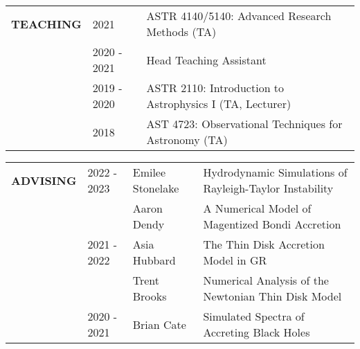 \documentclass{article}
\begin{document}
\begin{tabular}{p{4cm}p{2.2cm}l}
    \large{\textbf{TEACHING}} & 2021 & ASTR 4140/5140: Advanced Research Methods (TA)\\
    & 2020 - 2021 & Head Teaching Assistant \\
    & 2019 - 2020 & ASTR 2110: Introduction to Astrophysics I (TA, Lecturer)\\
    & 2018 & AST 4723: Observational Techniques for Astronomy (TA) \\
\end{tabular}
\vspace{0.25cm}





\begin{tabular}{p{4cm}p{2.2cm}ll}
    \large{\textbf{ADVISING}} & 2022 - 2023 & Emilee Stonelake & Hydrodynamic Simulations of Rayleigh-Taylor Instability\\
    
    &  & Aaron Dendy & A Numerical Model of Magentized Bondi Accretion \\
    
    & 2021 - 2022 & Asia Hubbard & The Thin Disk Accretion Model in GR\\
    & & Trent Brooks & Numerical Analysis of the Newtonian Thin Disk Model\\
     & 2020 - 2021 & Brian Cate & Simulated Spectra of Accreting Black Holes\\
\end{tabular}
\vspace{0.5cm}
\end{document}
